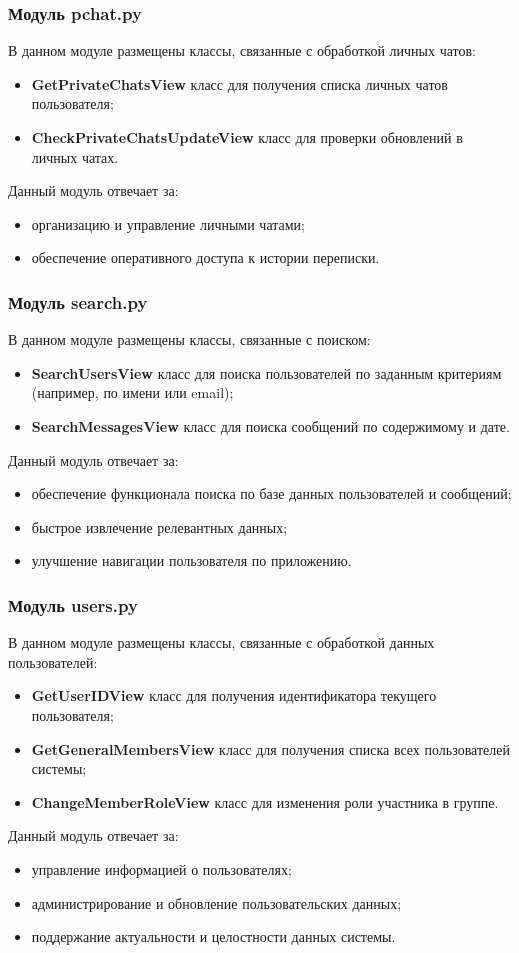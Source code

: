 \subsubsection{Модуль pchat.py}
В данном модуле размещены классы, связанные с обработкой личных чатов:
\begin{itemize}
	\item \textbf{GetPrivateChatsView} класс для получения списка личных чатов пользователя;
	\item \textbf{CheckPrivateChatsUpdateView} класс для проверки обновлений в личных чатах.
\end{itemize}
Данный модуль отвечает за:
\begin{itemize}
	\item организацию и управление личными чатами;
	\item обеспечение оперативного доступа к истории переписки.
\end{itemize}

\subsubsection{Модуль search.py}
В данном модуле размещены классы, связанные с поиском:
\begin{itemize}
	\item \textbf{SearchUsersView} класс для поиска пользователей по заданным критериям (например, по имени или email);
	\item \textbf{SearchMessagesView} класс для поиска сообщений по содержимому и дате.
\end{itemize}
Данный модуль отвечает за:
\begin{itemize}
	\item обеспечение функционала поиска по базе данных пользователей и сообщений;
	\item быстрое извлечение релевантных данных;
	\item улучшение навигации пользователя по приложению.
\end{itemize}

\subsubsection{Модуль users.py}
В данном модуле размещены классы, связанные с обработкой данных пользователей:
\begin{itemize}
	\item \textbf{GetUserIDView} класс для получения идентификатора текущего пользователя;
	\item \textbf{GetGeneralMembersView} класс для получения списка всех пользователей системы;
	\item \textbf{ChangeMemberRoleView} класс для изменения роли участника в группе.
\end{itemize}
Данный модуль отвечает за:
\begin{itemize}
	\item управление информацией о пользователях;
	\item администрирование и обновление пользовательских данных;
	\item поддержание актуальности и целостности данных системы.
\end{itemize}


